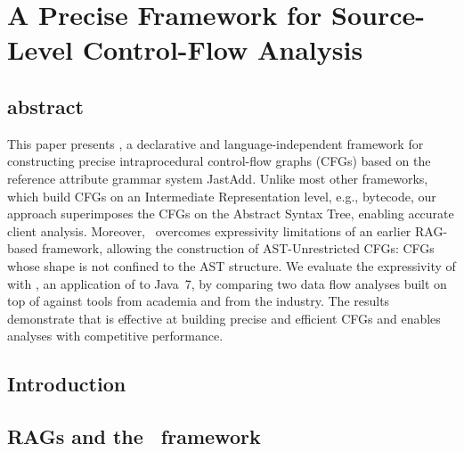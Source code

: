 

\chapter[A Precise Framework for Source-Level Control-Flow Analysis]{\texorpdfstring{%
A Precise Framework for Source-Level Control-Flow Analysis}{%
A Precise Framework for Source-Level Control-Flow Analysis}}

\paperRemark{\paperIref}





\section{abstract}
This paper presents \intracfg, a declarative and language-independent framework for constructing precise intraprocedural control-flow graphs (CFGs) based on the reference attribute grammar system JastAdd. Unlike most other frameworks, which build CFGs on an Intermediate Representation level, e.g., bytecode,  our approach superimposes the CFGs on the Abstract Syntax Tree, enabling accurate client analysis.
Moreover, \intracfg\ overcomes expressivity limitations of an earlier RAG-based framework, allowing the construction of AST-Unrestricted CFGs: CFGs whose shape is not confined to the AST structure.
We evaluate the expressivity of {\intracfg} with {\intraj}, an application of {\intracfg} to Java~7,
by comparing two data flow analyses built on top of {\intraj} against tools from academia and from the industry.
The results demonstrate that {\intraj} is effective at building precise and efficient CFGs and enables analyses with competitive performance.




\section{Introduction}
\label{sec:introduction}



\section{RAGs and the \intracfg\ framework}
\label{sec:framework}



